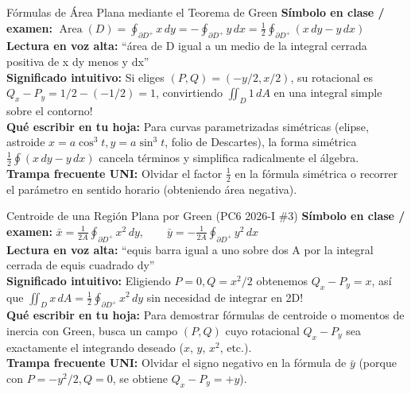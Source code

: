 \documentclass[11pt,a4paper]{article}
\begin{document}
\begin{definicionbox}{Fórmulas de Área Plana mediante el Teorema de Green}
\textbf{Símbolo en clase / examen:} $\operatorname{Area}(D) = \oint_{\partial D^+} x\,dy = -\oint_{\partial D^+} y\,dx = \frac{1}{2}\oint_{\partial D^+} (x\,dy - y\,dx)$\\[0.15cm]
\textbf{Lectura en voz alta:} ``área de D igual a un medio de la integral cerrada positiva de x dy menos y dx''\\[0.12cm]
\textbf{Significado intuitivo:} Si eliges $(P,Q) = (-y/2, x/2)$, su rotacional es $Q_x - P_y = 1/2 - (-1/2) = 1$, convirtiendo $\iint_D 1\,dA$ en una integral simple sobre el contorno!\\[0.12cm]
\textbf{Qué escribir en tu hoja:} Para curvas parametrizadas simétricas (elipse, astroide $x=a\cos^3 t, y=a\sin^3 t$, folio de Descartes), la forma simétrica $\frac{1}{2}\oint (x\,dy - y\,dx)$ cancela términos y simplifica radicalmente el álgebra.\\[0.12cm]
\textbf{Trampa frecuente UNI:} Olvidar el factor $\frac{1}{2}$ en la fórmula simétrica o recorrer el parámetro en sentido horario (obteniendo área negativa).
\end{definicionbox}

\begin{definicionbox}{Centroide de una Región Plana por Green (PC6 2026-I \#3)}
\textbf{Símbolo en clase / examen:} $\bar{x} = \frac{1}{2A}\oint_{\partial D^+} x^2\,dy, \qquad \bar{y} = -\frac{1}{2A}\oint_{\partial D^+} y^2\,dx$\\[0.15cm]
\textbf{Lectura en voz alta:} ``equis barra igual a uno sobre dos A por la integral cerrada de equis cuadrado dy''\\[0.12cm]
\textbf{Significado intuitivo:} Eligiendo $P=0, Q=x^2/2$ obtenemos $Q_x - P_y = x$, así que $\iint_D x\,dA = \frac{1}{2}\oint_{\partial D^+} x^2\,dy$ sin necesidad de integrar en 2D!\\[0.12cm]
\textbf{Qué escribir en tu hoja:} Para demostrar fórmulas de centroide o momentos de inercia con Green, busca un campo $(P,Q)$ cuyo rotacional $Q_x - P_y$ sea exactamente el integrando deseado ($x$, $y$, $x^2$, etc.).\\[0.12cm]
\textbf{Trampa frecuente UNI:} Olvidar el signo negativo en la fórmula de $\bar{y}$ (porque con $P = -y^2/2, Q = 0$, se obtiene $Q_x - P_y = +y$).
\end{definicionbox}
\end{document}
